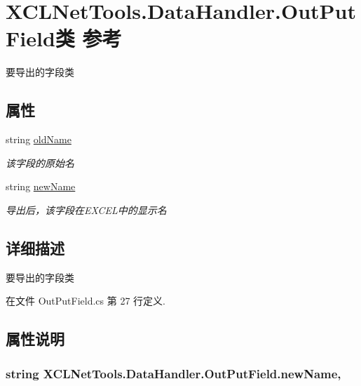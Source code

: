 \hypertarget{class_x_c_l_net_tools_1_1_data_handler_1_1_out_put_field}{\section{X\-C\-L\-Net\-Tools.\-Data\-Handler.\-Out\-Put\-Field类 参考}
\label{class_x_c_l_net_tools_1_1_data_handler_1_1_out_put_field}
}


要导出的字段类  


\subsection*{属性}
\begin{DoxyCompactItemize}
\item 
string \hyperlink{class_x_c_l_net_tools_1_1_data_handler_1_1_out_put_field_a6d43eedd53c9281dec699a79d443c3b3}{old\-Name}
\begin{DoxyCompactList}\small\item\em 该字段的原始名 \end{DoxyCompactList}\item 
string \hyperlink{class_x_c_l_net_tools_1_1_data_handler_1_1_out_put_field_a6dad198f86f056470802a9323058f19c}{new\-Name}
\begin{DoxyCompactList}\small\item\em 导出后，该字段在\-E\-X\-C\-E\-L中的显示名 \end{DoxyCompactList}\end{DoxyCompactItemize}


\subsection{详细描述}
要导出的字段类 



在文件 Out\-Put\-Field.\-cs 第 27 行定义.



\subsection{属性说明}
\hypertarget{class_x_c_l_net_tools_1_1_data_handler_1_1_out_put_field_a6dad198f86f056470802a9323058f19c}{
\subsubsection[{new\-Name}]{\setlength{\rightskip}{0pt plus 5cm}string X\-C\-L\-Net\-Tools.\-Data\-Handler.\-Out\-Put\-Field.\-new\-Name\hspace{0.3cm}{\ttfamily [get]}, {\ttfamily [set]}}}\label{class_x_c_l_net_tools_1_1_data_handler_1_1_out_put_field_a6dad198f86f056470802a9323058f19c}


